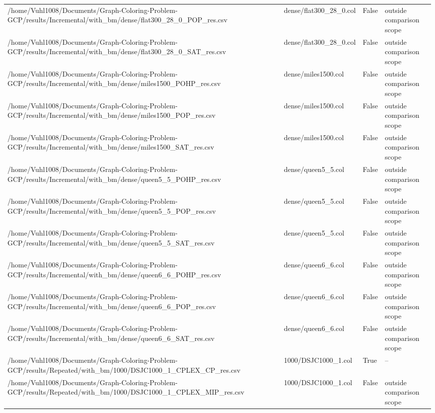 \begin{table}[htbp]
\begin{tabular}{llll}
/home/Vuhl1008/Documents/Graph-Coloring-Problem-GCP/results/Incremental/with\_bm/dense/flat300\_28\_0\_POP\_res.csv & dense/flat300\_28\_0.col & False & outside comparison scope \\
/home/Vuhl1008/Documents/Graph-Coloring-Problem-GCP/results/Incremental/with\_bm/dense/flat300\_28\_0\_SAT\_res.csv & dense/flat300\_28\_0.col & False & outside comparison scope \\
/home/Vuhl1008/Documents/Graph-Coloring-Problem-GCP/results/Incremental/with\_bm/dense/miles1500\_POHP\_res.csv & dense/miles1500.col & False & outside comparison scope \\
/home/Vuhl1008/Documents/Graph-Coloring-Problem-GCP/results/Incremental/with\_bm/dense/miles1500\_POP\_res.csv & dense/miles1500.col & False & outside comparison scope \\
/home/Vuhl1008/Documents/Graph-Coloring-Problem-GCP/results/Incremental/with\_bm/dense/miles1500\_SAT\_res.csv & dense/miles1500.col & False & outside comparison scope \\
/home/Vuhl1008/Documents/Graph-Coloring-Problem-GCP/results/Incremental/with\_bm/dense/queen5\_5\_POHP\_res.csv & dense/queen5\_5.col & False & outside comparison scope \\
/home/Vuhl1008/Documents/Graph-Coloring-Problem-GCP/results/Incremental/with\_bm/dense/queen5\_5\_POP\_res.csv & dense/queen5\_5.col & False & outside comparison scope \\
/home/Vuhl1008/Documents/Graph-Coloring-Problem-GCP/results/Incremental/with\_bm/dense/queen5\_5\_SAT\_res.csv & dense/queen5\_5.col & False & outside comparison scope \\
/home/Vuhl1008/Documents/Graph-Coloring-Problem-GCP/results/Incremental/with\_bm/dense/queen6\_6\_POHP\_res.csv & dense/queen6\_6.col & False & outside comparison scope \\
/home/Vuhl1008/Documents/Graph-Coloring-Problem-GCP/results/Incremental/with\_bm/dense/queen6\_6\_POP\_res.csv & dense/queen6\_6.col & False & outside comparison scope \\
/home/Vuhl1008/Documents/Graph-Coloring-Problem-GCP/results/Incremental/with\_bm/dense/queen6\_6\_SAT\_res.csv & dense/queen6\_6.col & False & outside comparison scope \\
/home/Vuhl1008/Documents/Graph-Coloring-Problem-GCP/results/Repeated/with\_bm/1000/DSJC1000\_1\_CPLEX\_CP\_res.csv & 1000/DSJC1000\_1.col & True & -- \\
/home/Vuhl1008/Documents/Graph-Coloring-Problem-GCP/results/Repeated/with\_bm/1000/DSJC1000\_1\_CPLEX\_MIP\_res.csv & 1000/DSJC1000\_1.col & False & outside comparison scope \\

\end{tabular}
\end{table}
